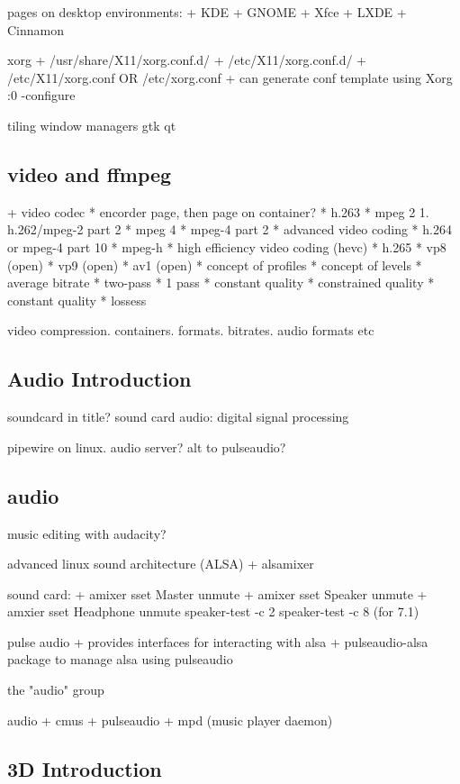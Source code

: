 pages on desktop environments:
+ KDE
+ GNOME
+ Xfce
+ LXDE
+ Cinnamon

xorg
+ /usr/share/X11/xorg.conf.d/
+ /etc/X11/xorg.conf.d/
+ /etc/X11/xorg.conf OR /etc/xorg.conf
+ can generate conf template using Xorg :0 -configure

tiling window managers
gtk
qt
\subsection{video and ffmpeg}
+ video codec
  * encorder page, then page on container?
  * h.263
  * mpeg 2
    1. h.262/mpeg-2 part 2
  * mpeg 4
    * mpeg-4 part 2
    * advanced video coding
    * h.264 or mpeg-4 part 10
  * mpeg-h
    * high efficiency video coding (hevc)
    * h.265
  * vp8 (open)
  * vp9 (open)
  * av1 (open)
  * concept of profiles
  * concept of levels
  * average bitrate
  * two-pass
  * 1 pass
  * constant quality
  * constrained quality
  * constant quality
  * lossess

video compression. containers. formats. bitrates. audio formats etc


\subsection{Audio Introduction}

soundcard in title?
sound card
audio: digital signal processing

pipewire on linux. audio server? alt to pulseaudio?

\subsection{audio}

music editing with  audacity?

advanced linux sound architecture (ALSA)
+ alsamixer

sound card:
+ amixer sset Master unmute
+ amixer sset Speaker unmute
+ amxier sset Headphone unmute
speaker-test -c 2
speaker-test -c 8 (for 7.1)

pulse audio
+ provides interfaces for interacting with alsa
+ pulseaudio-alsa package to manage alsa using pulseaudio

the "audio" group

audio
+ cmus
+ pulseaudio
+ mpd (music player daemon)


\subsection{3D Introduction}

